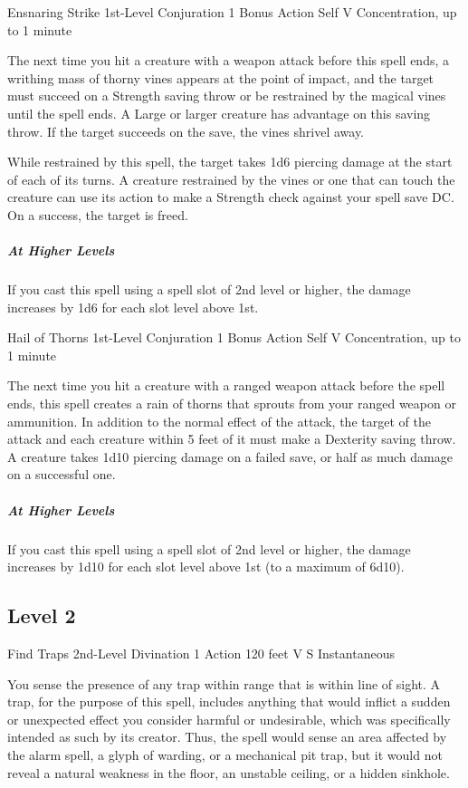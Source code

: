 \documentclass[letterpaper,openany,oneside,twocolumn]{book}
\begin{document}
\DndSpellHeader
  {Ensnaring Strike}
  {1st-Level Conjuration}
  {1 Bonus Action}
  {Self}
  {V}
  {Concentration, up to 1 minute}

The next time you hit a creature with a weapon attack before this spell ends, a writhing mass of thorny vines appears at the point of impact, and the target must succeed on a Strength saving throw or be restrained by the magical vines until the spell ends. A Large or larger creature has advantage on this saving throw. If the target succeeds on the save, the vines shrivel away.

While restrained by this spell, the target takes 1d6 piercing damage at the start of each of its turns. A creature restrained by the vines or one that can touch the creature can use its action to make a Strength check against your spell save DC. On a success, the target is freed.

\subparagraph*{At Higher Levels} If you cast this spell using a spell slot of 2nd level or higher, the damage increases by 1d6 for each slot level above 1st.

\DndSpellHeader
  {Hail of Thorns}
  {1st-Level Conjuration}
  {1 Bonus Action}
  {Self}
  {V}
  {Concentration, up to 1 minute}

The next time you hit a creature with a ranged weapon attack before the spell ends, this spell creates a rain of thorns that sprouts from your ranged weapon or ammunition. In addition to the normal effect of the attack, the target of the attack and each creature within 5 feet of it must make a Dexterity saving throw. A creature takes 1d10 piercing damage on a failed save, or half as much damage on a successful one.

\subparagraph{At Higher Levels} If you cast this spell using a spell slot of 2nd level or higher, the damage increases by 1d10 for each slot level above 1st (to a maximum of 6d10).

\subsection*{Level 2}

\DndSpellHeader
  {Find Traps}
  {2nd-Level Divination}
  {1 Action}
  {120 feet}
  {V S}
  {Instantaneous}

You sense the presence of any trap within range that is within line of sight. A trap, for the purpose of this spell, includes anything that would inflict a sudden or unexpected effect you consider harmful or undesirable, which was specifically intended as such by its creator. Thus, the spell would sense an area affected by the alarm spell, a glyph of warding, or a mechanical pit trap, but it would not reveal a natural weakness in the floor, an unstable ceiling, or a hidden sinkhole.
\end{document}
